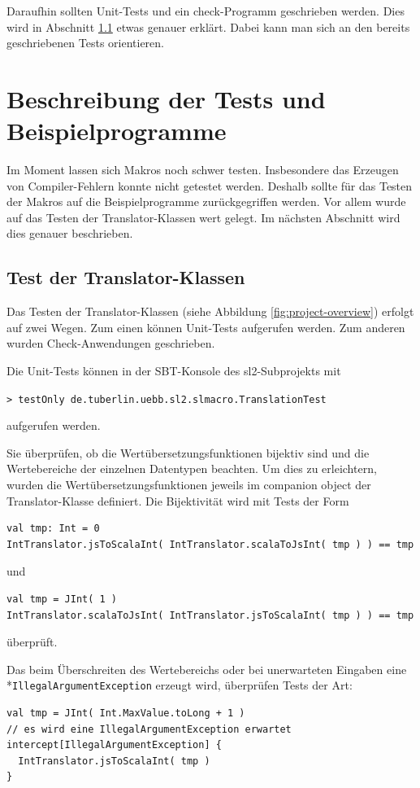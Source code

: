 \documentclass[12pt,bibtotoc]{scrreprt}
\begin{document}
Daraufhin sollten Unit-Tests und ein check-Programm geschrieben werden. Dies wird in Abschnitt \ref{sec:test-translators} etwas genauer erklärt. Dabei kann man sich an den bereits geschriebenen Tests orientieren.

\chapter{Beschreibung der Tests und Beispielprogramme}
\label{chap:tests-and-examples}

Im Moment lassen sich Makros noch schwer testen. Insbesondere das Erzeugen von Compiler-Fehlern konnte nicht getestet werden. Deshalb sollte für das Testen der Makros auf die Beispielprogramme zurückgegriffen werden.  Vor allem wurde auf das Testen der Translator-Klassen wert gelegt. Im nächsten Abschnitt wird dies genauer beschrieben. 

\section{Test der Translator-Klassen}
\label{sec:test-translators}

Das Testen der Translator-Klassen (siehe Abbildung \ref{fig:project-overview}) erfolgt auf zwei Wegen. Zum einen können Unit-Tests aufgerufen werden. Zum anderen wurden Check-Anwendungen geschrieben.

Die Unit-Tests können in der SBT-Konsole des sl2-Subprojekts mit

\begin{centering}
\lstinline!> testOnly de.tuberlin.uebb.sl2.slmacro.TranslationTest!\\
\end{centering}
aufgerufen werden.

Sie überprüfen, ob die Wertübersetzungsfunktionen bijektiv sind und die Wertebereiche der einzelnen Datentypen beachten. Um dies zu erleichtern, wurden die Wertübersetzungsfunktionen jeweils im companion object der Translator-Klasse definiert.  Die Bijektivität wird mit Tests der Form 
\begin{lstlisting}
val tmp: Int = 0
IntTranslator.jsToScalaInt( IntTranslator.scalaToJsInt( tmp ) ) == tmp
\end{lstlisting}
und
\begin{lstlisting}
val tmp = JInt( 1 )
IntTranslator.scalaToJsInt( IntTranslator.jsToScalaInt( tmp ) ) == tmp
\end{lstlisting}
überprüft.

Das beim Überschreiten des Wertebereichs oder bei unerwarteten Eingaben eine\\*\lstinline!IllegalArgumentException! erzeugt wird, überprüfen Tests der Art:
\begin{lstlisting}
val tmp = JInt( Int.MaxValue.toLong + 1 )
// es wird eine IllegalArgumentException erwartet
intercept[IllegalArgumentException] { 
  IntTranslator.jsToScalaInt( tmp )
}
\end{lstlisting} 
\end{document}
